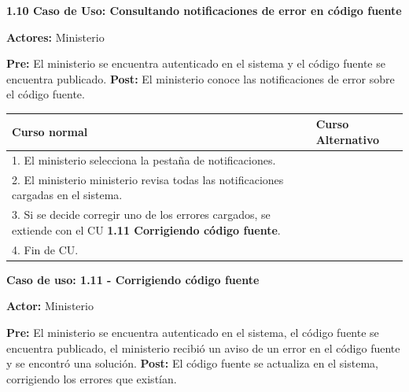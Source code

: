\textbf{1.10 Caso de Uso: Consultando notificaciones de error en código fuente}

\textbf{Actores:} Ministerio 

\textbf{Pre:} El ministerio se encuentra autenticado en el sistema y el código fuente se encuentra publicado.
\textbf{Post:} El ministerio conoce las notificaciones de error sobre el código fuente.


\begin{table}[h!]
	
 \begin{tabular}{|p{7.5cm} | p{7.5cm}|} 
 \hline
 \textbf{Curso normal} & \textbf{Curso Alternativo} \\
 \hline


1. El ministerio selecciona la pestaña de notificaciones. & \\
\hline


2. El ministerio ministerio revisa todas las notificaciones cargadas en el sistema. & \\
\hline


3. Si se decide corregir uno de los errores cargados, se extiende con el CU \textbf{1.11 Corrigiendo código fuente}. & \\
\hline


4. Fin de CU. & \\
\hline




 \end{tabular}

\end{table}


\textbf{Caso de uso: 1.11 - Corrigiendo código fuente}

\textbf{Actor:} Ministerio

\textbf{Pre:} El ministerio se encuentra autenticado en el sistema, el código fuente se encuentra publicado, el ministerio recibió un aviso de un error en el código fuente y se encontró una solución.
\textbf{Post:} El código fuente se actualiza en el sistema, corrigiendo los errores que existían.

